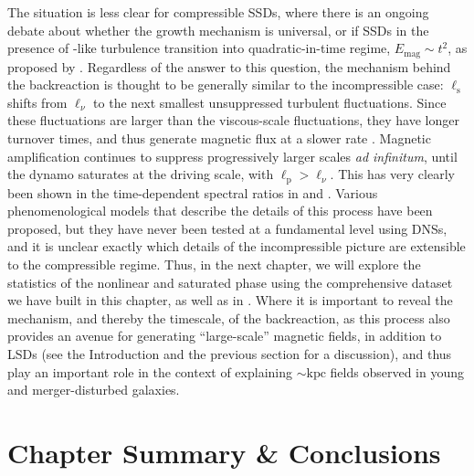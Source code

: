 The situation is less clear for compressible SSDs, where there is an ongoing debate about whether the growth mechanism is universal, or if SSDs in the presence of \citet{burgers1948_turbulence_model}-like turbulence transition into quadratic-in-time regime, $E_\mathrm{mag} \sim t^2$, as proposed by \citet{Schleicher2013_quadratic_growth}. Regardless of the answer to this question, the mechanism behind the backreaction is thought to be generally similar to the incompressible case: $\ell_\mathrm{s}$ shifts from $\ell_\nu$ to the next smallest unsuppressed turbulent fluctuations. Since these fluctuations are larger than the viscous-scale fluctuations, they have longer turnover times, and thus generate magnetic flux at a slower rate \citep{Schober2015_dynamo_saturation, galishnikova2022tearing}. Magnetic amplification continues to suppress progressively larger scales \textit{ad infinitum}, until the dynamo saturates at the driving scale, with $\ell_\mathrm{p} > \ell_\nu$. This has very clearly been shown in the time-dependent spectral ratios in \citet{beattie2022growth} and \citet{beattie2023bulk}. Various phenomenological models that describe the details of this process have been proposed, but they have never been tested at a fundamental level using DNSs, and it is unclear exactly which details of the incompressible picture are extensible to the compressible regime. Thus, in the next chapter, we will explore the statistics of the nonlinear and saturated phase using the comprehensive dataset we have built in this chapter, as well as in . Where it is important to reveal the mechanism, and thereby the timescale, of the backreaction, as this process also provides an avenue for generating ``large-scale'' magnetic fields, in addition to LSDs (see the Introduction and the previous section for a discussion), and thus play an important role in the context of explaining $\sim \mathrm{kpc}$ fields observed in young and merger-disturbed galaxies.

\section{Chapter Summary \& Conclusions}
\label{sec:conclusion}


